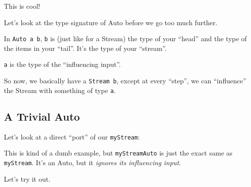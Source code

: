 \documentclass[]{article}
\newenvironment{Shaded}{}{}
\newcommand{\CommentTok}[1]{\textcolor[rgb]{0.38,0.63,0.69}{\textit{#1}}}
\newcommand{\DataTypeTok}[1]{\textcolor[rgb]{0.56,0.13,0.00}{#1}}
\newcommand{\DecValTok}[1]{\textcolor[rgb]{0.25,0.63,0.44}{#1}}
\newcommand{\KeywordTok}[1]{\textcolor[rgb]{0.00,0.44,0.13}{\textbf{#1}}}
\newcommand{\NormalTok}[1]{#1}
\newcommand{\OperatorTok}[1]{\textcolor[rgb]{0.40,0.40,0.40}{#1}}
\newcommand{\OtherTok}[1]{\textcolor[rgb]{0.00,0.44,0.13}{#1}}
\begin{document}
This is cool!

Let's look at the type signature of Auto before we go too much further.

In \texttt{Auto\ a\ b}, \texttt{b} is (just like for a Stream) the type of your
``head'' and the type of the items in your ``tail''. It's the type of your
``stream''.

\texttt{a} is the type of the ``influencing input''.

So now, we basically have a \texttt{Stream\ b}, except at every ``step'', we can
``influence'' the Stream with something of type \texttt{a}.

\subsection{A Trivial Auto}\label{a-trivial-auto}

Let's look at a direct ``port'' of our \texttt{myStream}:

\begin{Shaded}
\end{Shaded}

This is kind of a dumb example, but \texttt{myStreamAuto} is just the exact same
as \texttt{myStream}. It's an Auto, but it \emph{ignores its influencing input}.

Let's try it out.
\end{document}
